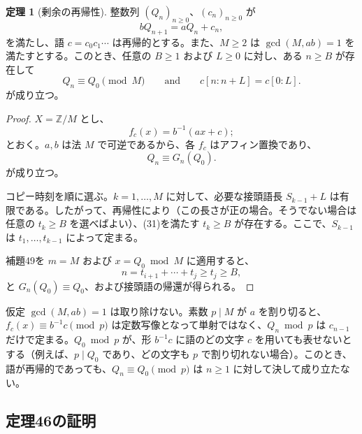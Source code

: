 \documentclass[11pt,reqno]{amsart}
\theoremstyle{definition}
\newtheorem{theorem}{定理}
\theoremstyle{definition}
\theoremstyle{remark}
\begin{document}
\begin{samepage}
\begin{theorem}[剰余の再帰性]\leavevmode\label{thm:50}
整数列 \((Q_n)_{n\ge0}\)、\((c_n)_{n\ge0}\) が
\[
bQ_{n+1}=aQ_n+c_n,
\]
を満たし、語 \(c=c_0c_1\cdots\) は再帰的とする。また、\(M\ge2\) は
\(\gcd(M,ab)=1\) を満たすとする。このとき、任意の \(B\ge1\) および \(L\ge0\) に対し、ある
\(n\ge B\) が存在して
\[
Q_n\equiv Q_0\pmod M\qquad \text{and}\qquad c[n:n+L]=c[0:L].
\]
が成り立つ。
\label{thm-end:50}
\end{theorem}
\end{samepage}

\begin{proof}\leavevmode\label{proof:50}
\(X=\mathbb Z/M\) とし、
\[
f_c(x)=b^{-1}(ax+c);
\]
とおく。\(a,b\) は法 \(M\) で可逆であるから、各 \(f_c\) はアフィン置換であり、
\[
Q_n\equiv G_n(Q_0).
\]
が成り立つ。

コピー時刻を順に選ぶ。\(k=1,\ldots,M\) に対して、必要な接頭語長 \(S_{k-1}+L\) は有限である。したがって、再帰性により（この長さが正の場合。そうでない場合は任意の \(t_k\ge B\) を選べばよい）、(31)を満たす \(t_k\ge B\) が存在する。ここで、\(S_{k-1}\) は \(t_1,\ldots,t_{k-1}\) によって定まる。

補題49を \(m=M\) および \(x=Q_0\bmod M\) に適用すると、
\[
n=t_{i+1}+\cdots+t_j\ge t_j\ge B,
\]
と \(G_n(Q_0)\equiv Q_0\)、および接頭語の帰還が得られる。\qedhere
\end{proof}

仮定 \(\gcd(M,ab)=1\) は取り除けない。素数 \(p\mid M\) が \(a\) を割り切ると、\(f_c(x)\equiv b^{-1}c\pmod p\) は定数写像となって単射ではなく、\(Q_n\bmod p\) は \(c_{n-1}\) だけで定まる。\(Q_0\bmod p\) が、形 \(b^{-1}c\) に語のどの文字 \(c\) を用いても表せないとする（例えば、\(p\mid Q_0\) であり、どの文字も \(p\) で割り切れない場合）。このとき、語が再帰的であっても、\(Q_n\equiv Q_0\pmod p\) は \(n\ge1\) に対して決して成り立たない。

\subsection{定理46の証明}\label{sec:B.3}
\end{document}

